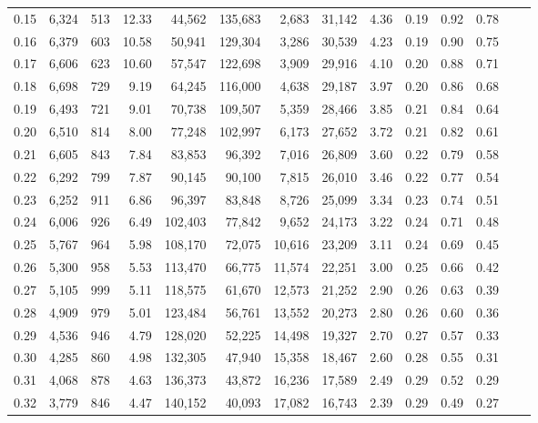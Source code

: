 \begin{tabular}{rrrrrrrrrrrrrr}
0.15 &  6,324 &  513 &   12.33 &   44,562 &  135,683 &   2,683 &  31,142 &  4.36 &  0.19 &  0.92 &      0.78 \\
0.16 &  6,379 &  603 &   10.58 &   50,941 &  129,304 &   3,286 &  30,539 &  4.23 &  0.19 &  0.90 &      0.75 \\
0.17 &  6,606 &  623 &   10.60 &   57,547 &  122,698 &   3,909 &  29,916 &  4.10 &  0.20 &  0.88 &      0.71 \\
0.18 &  6,698 &  729 &    9.19 &   64,245 &  116,000 &   4,638 &  29,187 &  3.97 &  0.20 &  0.86 &      0.68 \\
0.19 &  6,493 &  721 &    9.01 &   70,738 &  109,507 &   5,359 &  28,466 &  3.85 &  0.21 &  0.84 &      0.64 \\
0.20 &  6,510 &  814 &    8.00 &   77,248 &  102,997 &   6,173 &  27,652 &  3.72 &  0.21 &  0.82 &      0.61 \\
0.21 &  6,605 &  843 &    7.84 &   83,853 &   96,392 &   7,016 &  26,809 &  3.60 &  0.22 &  0.79 &      0.58 \\
0.22 &  6,292 &  799 &    7.87 &   90,145 &   90,100 &   7,815 &  26,010 &  3.46 &  0.22 &  0.77 &      0.54 \\
0.23 &  6,252 &  911 &    6.86 &   96,397 &   83,848 &   8,726 &  25,099 &  3.34 &  0.23 &  0.74 &      0.51 \\
0.24 &  6,006 &  926 &    6.49 &  102,403 &   77,842 &   9,652 &  24,173 &  3.22 &  0.24 &  0.71 &      0.48 \\
0.25 &  5,767 &  964 &    5.98 &  108,170 &   72,075 &  10,616 &  23,209 &  3.11 &  0.24 &  0.69 &      0.45 \\
0.26 &  5,300 &  958 &    5.53 &  113,470 &   66,775 &  11,574 &  22,251 &  3.00 &  0.25 &  0.66 &      0.42 \\
0.27 &  5,105 &  999 &    5.11 &  118,575 &   61,670 &  12,573 &  21,252 &  2.90 &  0.26 &  0.63 &      0.39 \\
0.28 &  4,909 &  979 &    5.01 &  123,484 &   56,761 &  13,552 &  20,273 &  2.80 &  0.26 &  0.60 &      0.36 \\
0.29 &  4,536 &  946 &    4.79 &  128,020 &   52,225 &  14,498 &  19,327 &  2.70 &  0.27 &  0.57 &      0.33 \\
0.30 &  4,285 &  860 &    4.98 &  132,305 &   47,940 &  15,358 &  18,467 &  2.60 &  0.28 &  0.55 &      0.31 \\
0.31 &  4,068 &  878 &    4.63 &  136,373 &   43,872 &  16,236 &  17,589 &  2.49 &  0.29 &  0.52 &      0.29 \\
0.32 &  3,779 &  846 &    4.47 &  140,152 &   40,093 &  17,082 &  16,743 &  2.39 &  0.29 &  0.49 &      0.27 \\

\end{tabular}
